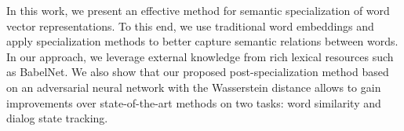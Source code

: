 In this work, we present an effective method for semantic specialization of word vector representations. To this end, we use traditional word embeddings and apply specialization methods to better capture semantic relations between words. In our approach, we leverage external knowledge from rich lexical resources such as BabelNet. We also show that our proposed post-specialization method based on an adversarial neural network with the Wasserstein distance allows to gain improvements over state-of-the-art methods on two tasks: word similarity and dialog state tracking.
